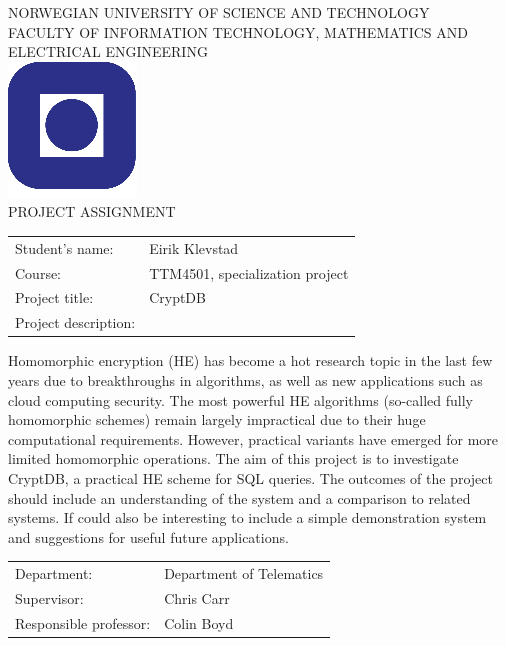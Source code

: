 \documentclass[a4paper,11pt]{article}
\begin{document}
\sffamily
\begin{titlepage}
\begin{center}
\textsc{NORWEGIAN UNIVERSITY OF SCIENCE AND TECHNOLOGY\\
FACULTY OF  INFORMATION TECHNOLOGY, MATHEMATICS AND ELECTRICAL ENGINEERING} \\
\vspace{0.5cm} 
\includegraphics[scale=0.5]{NTNU-logo} \\
\vspace{1.0cm}
{\Huge{PROJECT ASSIGNMENT}}
\vspace{1.0cm}
\end{center}

\begin{tabular}{@{}p{5cm}l}
Student's name:		& Eirik Klevstad\\
Course: 		& TTM4501, specialization project \\
Project title: 		& CryptDB \\
Project description: 	& \\
\end{tabular}

Homomorphic encryption (HE) has become a hot research topic in the last few years due to breakthroughs in algorithms, as well as new applications such as cloud computing security. The most powerful HE algorithms (so-called fully homomorphic schemes) remain largely impractical due to their huge computational requirements. However, practical variants have emerged for more limited homomorphic operations.
The aim of this project is to investigate CryptDB, a practical HE scheme for SQL queries. The outcomes of the project should include an understanding of the system and a comparison to related systems. If could also be interesting to include a simple demonstration system and suggestions for useful future applications. 

\begin{tabular}{@{}p{5cm}l}
Department:		& Department of Telematics \\
Supervisor:		& Chris Carr \\
Responsible professor: 	& Colin Boyd \\
\end{tabular}

\end{titlepage}
\end{document}
